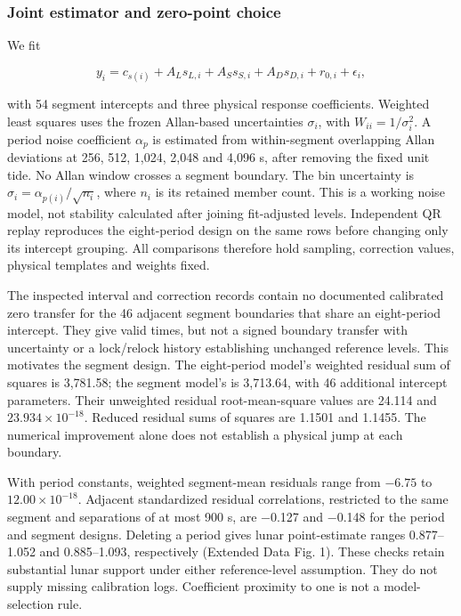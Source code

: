 \documentclass[
  10pt,
  a4paper,
]{article}
\begin{document}
\hypertarget{joint-estimator-and-zero-point-choice}{%
\subsubsection{Joint estimator and zero-point
choice}\label{joint-estimator-and-zero-point-choice}}

We fit

\[y_i=c_{s(i)}+A_Ls_{L,i}+A_Ss_{S,i}+A_Ds_{D,i}+r_{0,i}+\epsilon_i,\]

with 54 segment intercepts and three physical response coefficients.
Weighted least squares uses the frozen Allan-based uncertainties
\(\sigma_i\), with \(W_{ii}=1/\sigma_i^2\). A period noise coefficient
\(\alpha_p\) is estimated from within-segment overlapping Allan
deviations at 256, 512, 1,024, 2,048 and 4,096 s, after removing the
fixed unit tide. No Allan window crosses a segment boundary. The bin
uncertainty is \(\sigma_i=\alpha_{p(i)}/\sqrt{n_i}\), where \(n_i\) is
its retained member count. This is a working noise model, not stability
calculated after joining fit-adjusted levels. Independent QR replay
reproduces the eight-period design on the same rows before changing only
its intercept grouping. All comparisons therefore hold sampling,
correction values, physical templates and weights fixed.

The inspected interval and correction records contain no documented
calibrated zero transfer for the 46 adjacent segment boundaries that
share an eight-period intercept. They give valid times, but not a signed
boundary transfer with uncertainty or a lock/relock history establishing
unchanged reference levels. This motivates the segment design. The
eight-period model's weighted residual sum of squares is 3,781.58; the
segment model's is 3,713.64, with 46 additional intercept parameters.
Their unweighted residual root-mean-square values are 24.114 and
\(23.934\times10^{-18}\). Reduced residual sums of squares are 1.1501
and 1.1455. The numerical improvement alone does not establish a
physical jump at each boundary.

With period constants, weighted segment-mean residuals range from
\(-6.75\) to \(12.00\times10^{-18}\). Adjacent standardized residual
correlations, restricted to the same segment and separations of at most
900 s, are −0.127 and −0.148 for the period and segment designs.
Deleting a period gives lunar point-estimate ranges 0.877--1.052 and
0.885--1.093, respectively (Extended Data Fig. 1). These checks retain
substantial lunar support under either reference-level assumption. They
do not supply missing calibration logs. Coefficient proximity to one is
not a model-selection rule.
\end{document}

